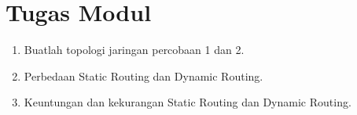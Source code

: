 \section*{Tugas Modul} %
\begin{enumerate}
    \item Buatlah topologi jaringan percobaan 1 dan 2.
    \item Perbedaan Static Routing dan Dynamic Routing.
    \item Keuntungan dan kekurangan Static Routing dan Dynamic Routing.
\end{enumerate}